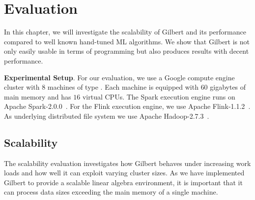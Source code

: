 \section{Evaluation}
\label{sec:evaluation}

In this chapter, we will investigate the scalability of Gilbert and its performance compared to well known hand-tuned ML algorithms.
We show that Gilbert is not only easily usable in terms of programming but also produces results with decent performance.

\textbf{Experimental Setup}. For our evaluation, we use a Google compute engine cluster with $8$ machines of type .
Each machine is equipped with $60$ gigabytes of main memory and has $16$ virtual CPUs. 
The Spark execution engine runs on Apache Spark-2.0.0~\cite{spark}.
For the Flink execution engine, we use Apache Flink-1.1.2~\cite{flink}. 
As underlying distributed file system we use Apache Hadoop-2.7.3~\cite{hadoop:2008a}.

\subsection{Scalability}

The scalability evaluation investigates how Gilbert behaves under increasing work loads and how well it can exploit varying cluster sizes.
As we have implemented Gilbert to provide a scalable linear algebra environment, it is important that it can process data sizes exceeding the main memory of a single machine.

